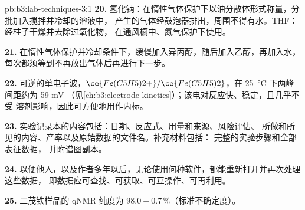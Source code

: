 \begin{solution}{pb:b3:lab-techniques-3:1}
\textbf{20.} 氢化钠：在惰性气体保护下以油分散体形式称量，分批加入搅拌并冷却的溶液中，
产生的气体经鼓泡器排出，周围不得有水。THF：经柱子干燥并去除过氧化物，
在通风橱中、氮气保护下使用。

\textbf{21.} 在惰性气体保护并冷却条件下，缓慢加入异丙醇，随后加入乙醇，再加入水，
每次都须等到不再放出气体后再进行下一步。

\textbf{22.} 可逆的单电子波，$\ce{Fe(C5H5)2+}/\ce{Fe(C5H5)2}$，在 \qty{25}{\celsius} 下两峰间距约为 59 mV
（见\cref{ch:b3:electrode-kinetics}）；该电对反应快、稳定，且几乎不受
溶剂影响，因此可方便地用作内标。

\textbf{23.} 实验记录本的内容包括：日期、反应式、用量和来源、风险评估、
所做和所见的内容、产率以及原始数据的文件名。补充材料包括：
完整的实验步骤和全部表征数据，
并附谱图副本。

\textbf{24.} 以便他人，以及作者多年以后，无论使用何种软件，都能重新打开并再次处理这些数据，
即数据应可查找、可获取、可互操作、可再利用。

\textbf{25.} 二茂铁样品的 qNMR 纯度为 $98.0 \pm 0.7$\,\%（标准不确定度）。
\end{solution}
